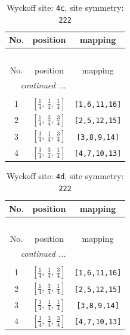 \documentclass[fleqn,8pt]{jsarticle}
\begin{document}
\renewcommand{\arraystretch}{1.2}
\begin{longtable}{ccc}
\caption{Wyckoff site: {\tt 4c}, site symmetry: {\tt 222}}
 \\
 \hline \hline
No. & position & mapping \\ \hline \endfirsthead

\multicolumn{2}{l}{\tablename\ \thetable{}} \\
 \hline \hline
No. & position & mapping \\ \hline \endhead

 \hline \hline
\multicolumn{2}{r}{\footnotesize\it continued ...} \\ \endfoot

 \hline \hline
\multicolumn{2}{r}{} \\ \endlastfoot

1 & $\left[ \frac{1}{4},\, \frac{1}{4},\, \frac{1}{4} \right]$ & {\tt [1,6,11,16]} \\ \hline
2 & $\left[ \frac{1}{4},\, \frac{3}{4},\, \frac{3}{4} \right]$ & {\tt [2,5,12,15]} \\ \hline
3 & $\left[ \frac{3}{4},\, \frac{1}{4},\, \frac{3}{4} \right]$ & {\tt [3,8,9,14]} \\ \hline
4 & $\left[ \frac{3}{4},\, \frac{3}{4},\, \frac{1}{4} \right]$ & {\tt [4,7,10,13]} \\
\end{longtable}
\renewcommand{\arraystretch}{1.2}
\begin{longtable}{ccc}
\caption{Wyckoff site: {\tt 4d}, site symmetry: {\tt 222}}
 \\
 \hline \hline
No. & position & mapping \\ \hline \endfirsthead

\multicolumn{2}{l}{\tablename\ \thetable{}} \\
 \hline \hline
No. & position & mapping \\ \hline \endhead

 \hline \hline
\multicolumn{2}{r}{\footnotesize\it continued ...} \\ \endfoot

 \hline \hline
\multicolumn{2}{r}{} \\ \endlastfoot

1 & $\left[ \frac{1}{4},\, \frac{1}{4},\, \frac{3}{4} \right]$ & {\tt [1,6,11,16]} \\ \hline
2 & $\left[ \frac{1}{4},\, \frac{3}{4},\, \frac{1}{4} \right]$ & {\tt [2,5,12,15]} \\ \hline
3 & $\left[ \frac{3}{4},\, \frac{1}{4},\, \frac{1}{4} \right]$ & {\tt [3,8,9,14]} \\ \hline
4 & $\left[ \frac{3}{4},\, \frac{3}{4},\, \frac{3}{4} \right]$ & {\tt [4,7,10,13]} \\
\end{longtable}
\end{document}

